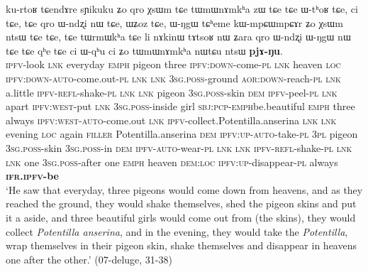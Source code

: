 \begin{exe}
\ex \label{ex:chain.pjANu}
\gll ku-rtoʁ tɕendɤre sɲikuku ʑo qro χsɯm  tɕe tɯmɯnɤmkʰa zɯ  tɕe  tɕe ɯ-tʰoʁ  tɕe, ci  tɕe, tɕe qro ɯ-ndʐi nɯ  tɕe, ɯʑoz  tɕe, ɯ-ŋgɯ tɕʰeme kɯ-mpɕɯ\redp{}mpɕɤr ʑo χsɯm ntsɯ  tɕe  tɕe, tɕe tɯrmɯkʰa tɕe li nɤkinɯ tɤtsoʁ nɯ  ʑara qro ɯ-ndʐi ɯ-ŋgɯ nɯ  tɕe tɕe  qʰe tɕe ci ɯ-qʰu ci ʑo tɯmɯnɤmkʰa nɯtɕu  ntsɯ \textbf{pjɤ-ŋu}. \\
\textsc{ipfv}-look \textsc{lnk} everyday \textsc{emph} pigeon three \textsc{ipfv}:\textsc{down}-come-\textsc{pl} \textsc{lnk} heaven \textsc{loc} \textsc{ipfv}:\textsc{down}-\textsc{auto}-come.out-\textsc{pl} \textsc{lnk} \textsc{lnk}  \textsc{3sg}.\textsc{poss}-ground \textsc{aor}:\textsc{down}-reach-\textsc{pl} \textsc{lnk} a.little \textsc{ipfv}-\textsc{refl}-shake-\textsc{pl} \textsc{lnk} \textsc{lnk} pigeon \textsc{3sg}.\textsc{poss}-skin \textsc{dem} \textsc{ipfv}-peel-\textsc{pl} \textsc{lnk} apart \textsc{ipfv}:\textsc{west}-put \textsc{lnk} \textsc{3sg}.\textsc{poss}-inside girl \textsc{sbj}:\textsc{pcp}-\textsc{emph}\redp{}be.beautiful \textsc{emph} three always \textsc{ipfv}:\textsc{west}-\textsc{auto}-come.out \textsc{lnk} \textsc{ipfv}-collect.Potentilla.anserina \textsc{lnk} \textsc{lnk} evening \textsc{loc} again \textsc{filler} Potentilla.anserina \textsc{dem} \textsc{ipfv}:\textsc{up}-\textsc{auto}-take-\textsc{pl} \textsc{3pl} pigeon \textsc{3sg}.\textsc{poss}-skin \textsc{3sg}.\textsc{poss}-in \textsc{dem} \textsc{ipfv}-\textsc{auto}-wear-\textsc{pl} \textsc{lnk} \textsc{lnk}  \textsc{ipfv}-\textsc{refl}-shake-\textsc{pl} \textsc{lnk} \textsc{lnk} one \textsc{3sg}.\textsc{poss}-after one \textsc{emph} heaven \textsc{dem}:\textsc{loc} \textsc{ipfv}:\textsc{up}-disappear-\textsc{pl} always \textbf{\textsc{ifr}.\textsc{ipfv}-be}  \\
\glt `He saw that everyday, three pigeons would come down from heavens, and as they reached the ground, they would shake themselves, shed the pigeon skins and put it a aside, and three beautiful girls would come out from (the skins), they would collect \textit{Potentilla anserina}, and in the evening, they would take the \textit{Potentilla}, wrap themselves in their pigeon skin, shake themselves and disappear in heavens one after the other.' (07-deluge, 31-38)
\end{exe}

